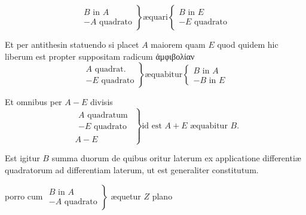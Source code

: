 \documentclass[11pt,a4paper]{article}
\begin{document}
\[ \left.\begin{array}{l} B \text{ in } A \\ - A \text{ quadrato} \end{array}\right\} \text{æquari} \left\{\begin{array}{l} B \text{ in } E \\ - E \text{ quadrato} \end{array}\right. \]

Et per antithesin statuendo si placet $A$ maiorem quam $E$ quod quidem hic liberum est propter suppositam radicum ἀμφιβολίαν
\[ \left.\begin{array}{l} A \text{ quadrat.} \\ - E \text{ quadrato} \end{array}\right\} \text{æquabitur} \left\{\begin{array}{l} B \text{ in } A \\ - B \text{ in } E \end{array}\right. \]

Et omnibus per $A - E$ divisis
\[ \left.\begin{array}{c} \begin{array}{l} A \text{ quadratum} \\ - E \text{ quadrato} \end{array} \\ \hline A - E \end{array}\right\} \text{id est } A + E \text{ æquabitur } B. \]

Est igitur $B$ summa duorum de quibus oritur laterum  ex applicatione differentiæ quadratorum ad differentiam laterum, ut est generaliter constitutum.

porro cum $\left.\begin{array}{l} B \text{ in } A \\ - A \text{ quadrato} \end{array}\right\}$ æquetur $Z$ plano
\end{document}
